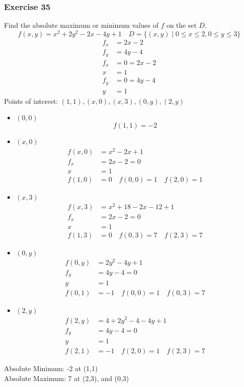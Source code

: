 \documentclass[letterpaper, 12pt]{math}
\begin{document}
\subsubsection*{Exercise 35}
Find the absolute maximum or minimum values of \( f \) on the set \( D \).
\[ f(x,y) = x^2+2y^2-2x-4y+1 \quad D = \{(x,y)\mid0\le x\le2,0\le y\le 3\} \]
\begin{align*}
  f_x &= 2x-2 \\
  f_y &= 4y-4 \\
  f_x &= 0 = 2x-2 \\
  x &= 1 \\
  f_y &= 0 = 4y-4 \\
  y &= 1
\end{align*}
Points of interest: \( (1,1), (x,0), (x,3), (0,y), (2,y) \)
\begin{itemize}
  \item \( (0,0) \)
  \[ f(1,1) = -2 \]
  \item \( (x,0) \)
  \begin{align*}
    f(x,0) &= x^2-2x+1 \\
    f_x &= 2x-2 = 0 \\
    x &= 1 \\
    f(1,0) &= 0 \quad f(0,0) = 1 \quad f(2,0) = 1
  \end{align*}
  \item \( (x,3) \)
  \begin{align*}
    f(x,3) &= x^2+18-2x-12+1 \\
    f_x &= 2x-2 = 0 \\
    x &= 1 \\
    f(1,3) &= 0 \quad f(0,3) = 7 \quad f(2,3) = 7
  \end{align*}
  \item \( (0,y) \)
  \begin{align*}
    f(0,y) &= 2y^2-4y+1 \\
    f_y &= 4y-4 = 0 \\
    y &= 1 \\
    f(0,1) &= -1 \quad f(0,0) = 1 \quad f(0,3) = 7
  \end{align*}
  \item \( (2,y) \)
  \begin{align*}
    f(2,y) &= 4+2y^2-4-4y+1 \\
    f_y &= 4y-4 = 0 \\
    y &= 1 \\
    f(2,1) &= -1 \quad f(2,0) = 1 \quad f(2,3) = 7
  \end{align*}
\end{itemize}
Absolute Minimum: -2 at (1,1) \\
Absolute Maximum: 7 at (2,3), and (0,3)
\end{document}
